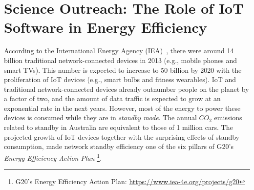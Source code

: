 \documentclass[12pt,english]{amsart}
\begin{document}

\section{Science Outreach: The Role of IoT Software in Energy Efficiency}

According to the International Energy Agency (IEA)~\cite{iea.data}, there were
around 14 billion traditional network-connected devices in 2013 (e.g., mobile
phones and smart TVs).
This number is expected to increase to 50 billion by 2020 with
the proliferation of IoT devices (e.g., smart bulbs and fitness wearables).
%
IoT and traditional network-connected devices already outnumber people on the
planet by a factor of two, and the amount of data traffic is expected to grow
at an exponential rate in the next years.
%
However, most of the energy to power these devices is consumed while they are
in \emph{standby mode}.
%
The annual $CO_2$ emissions related to standby in Australia are equivalent to
those of 1 million cars.
%
%
The projected growth of IoT devices together with the surprising effects of
standby consumption, made network standby efficiency one of the six
pillars of G20's \emph{Energy Efficiency Action Plan}%
\footnote{G20's Energy Efficiency Action Plan: \url{https://www.iea-4e.org/projects/g20}}.
\end{document}
